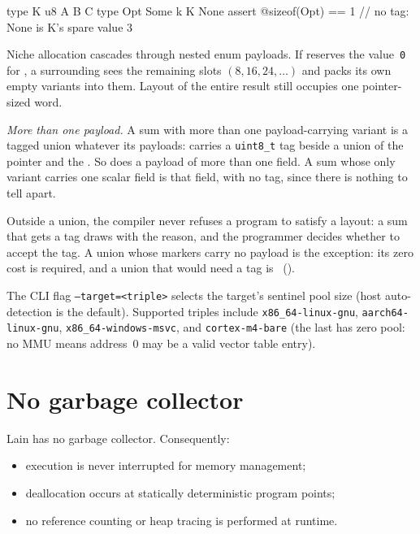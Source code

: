 \begin{laincode}
type K u8 {
    A
    B
    C
}
type Opt {
    Some { k K }
    None
}
assert @sizeof(Opt) == 1         // no tag: None is K's spare value 3
\end{laincode}

\pnum
Niche allocation cascades through nested enum payloads. If
 reserves the value~\texttt{0} for , a
surrounding  sees the remaining slots
$(8, 16, 24, \ldots)$ and packs its own empty variants into them.
Layout of the entire result still occupies one pointer-sized word.

\pnum
\textit{More than one payload.} A sum with more than one
payload-carrying variant is a tagged union whatever its payloads:
 carries a \texttt{uint8\_t} tag beside a
union of the pointer and the . So does a payload of more
than one field. A sum whose only variant carries one scalar field is
that field, with no tag, since there is nothing to tell apart.

\pnum
Outside a  union, the compiler never refuses a
program to satisfy a layout: a sum that gets a tag draws
 with the reason, and the programmer decides whether to
accept the tag. A union whose markers carry no payload is the
exception: its zero cost is required, and a union that would need a
tag is \illformed{}~().

\pnum
The CLI flag \texttt{--target=<triple>} selects the target's sentinel
pool size (host auto-detection is the default). Supported triples
include \texttt{x86\_64-linux-gnu}, \texttt{aarch64-linux-gnu},
\texttt{x86\_64-windows-msvc}, and \texttt{cortex-m4-bare} (the
last has zero pool: no MMU means address~0 may be a valid vector
table entry).

\section{No garbage collector}
\label{sec:mem.no-gc}

\pnum
Lain has no garbage collector.  Consequently:
\begin{itemize}
  \item execution is never interrupted for memory management;
  \item deallocation occurs at statically deterministic program points;
  \item no reference counting or heap tracing is performed at runtime.
\end{itemize}

